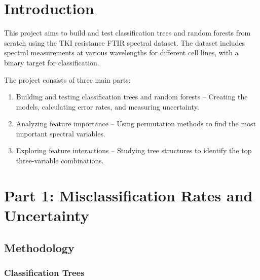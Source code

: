 \documentclass[fleqn,moreauthors,10pt]{ds_report}
\begin{document}
\flushbottom 

\maketitle

\thispagestyle{empty} 


\section*{Introduction}

This project aims to build and test classification trees and random forests from scratch using the TKI resistance FTIR spectral dataset. The dataset includes spectral measurements at various wavelengths for different cell lines, with a binary target for classification.

The project consists of three main parts:

\begin{enumerate}
\item Building and testing classification trees and random forests – Creating the models, calculating error rates, and measuring uncertainty.
\item Analyzing feature importance – Using permutation methods to find the most important spectral variables.
\item Exploring feature interactions – Studying tree structures to identify the top three-variable combinations.
\end{enumerate}



\section*{Part 1: Misclassification Rates and Uncertainty}

\subsection*{Methodology}

\subsubsection*{Classification Trees}
\end{document}
